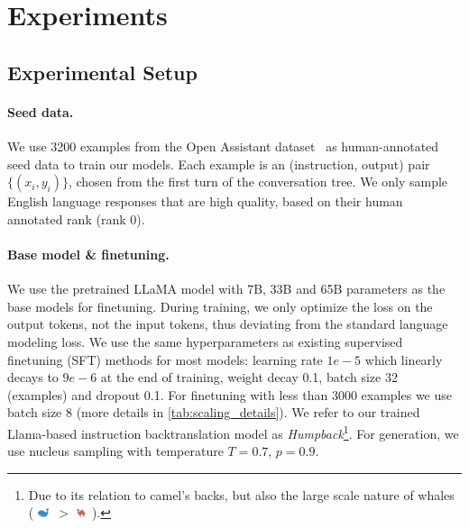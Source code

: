 \section{Experiments}
\label{results}



\subsection{Experimental Setup}
\label{subsec:exp_setup}


\paragraph{Seed data.}  We use 3200 examples from the Open Assistant dataset~\citep{kopf2023openassistant} as human-annotated seed data to train our models. Each example is an (instruction, output) pair $\{(x_{i}, y_{i})\}$, chosen from the first turn of the conversation tree. We only sample English language responses that are high quality, based on their human annotated rank (rank 0). 

\vspace{-2mm}
\paragraph{Base model \& finetuning.} We use the pretrained LLaMA model \citep{touvron2023llama} with 7B, 33B and 65B parameters as the base models for finetuning. During training, we only optimize the loss on the output tokens, not the input tokens, thus deviating from the standard language modeling loss. We use the same hyperparameters as existing supervised finetuning (SFT) methods \citep{zhou2023lima,touvron2023llama} for most models:  learning rate $1e-5$ which linearly decays to $9e-6$ at the end of training, weight decay 0.1, batch size 32 (examples) and dropout 0.1. For finetuning with less than 3000 examples we use batch size 8 (more details in \autoref{tab:scaling_details}). We refer to our trained Llama-based  instruction backtranslation model as {\em Humpback}\footnote{Due to its relation to camel's backs, but also the large scale nature of whales ( 
\includegraphics[width=3.3mm]{figs/1f40b.pdf}~{\footnotesize{$>$}}
\includegraphics[width=2.7mm]{figs/1f42a.pdf}~).
}. For generation, we use nucleus sampling \citep{holtzman2019curious} with temperature $T=0.7$, $p=0.9$.
\vspace{-2mm}
